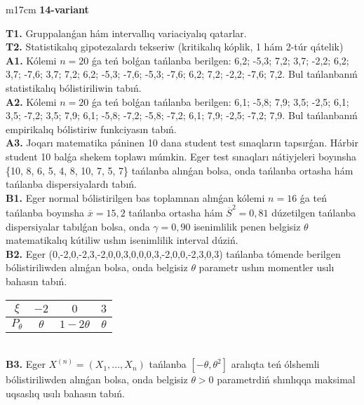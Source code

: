 \documentclass{article}
\begin{document}
\vspace{1cm}


\begin{tabular}{m{17cm}}
\textbf{14-variant}
\newline

\textbf{T1.} 
Gruppalanǵan hám intervallıq variaciyalıq qatarlar.
 \\
\textbf{T2.} 
Statistikalıq gipotezalardı tekseriw (kritikalıq kóplik, 1 hám 2-túr qátelik)
 \\
\textbf{A1.} 
Kólemi \(n = 20\) ǵa teń bolǵan tańlanba berilgen: 6,2; -5,3; 7,2; 3,7; -2,2; 6,2; 3,7; -7,6; 3,7; 7,2; 6,2; -5,3; -7,6; -5,3; -7,6; 6,2; 7,2; -2,2; -7,6; 7,2. Bul tańlanbanıń statistikalıq bólistiriliwin tabıń.
 \\
\textbf{A2.} 
Kólemi \(n = 20\) ǵa teń bolǵan tańlanba berilgen: 6,1; -5,8; 7,9; 3,5; -2,5; 6,1; 3,5; -7,2; 3,5; 7,9; 6,1; -5,8; -7,2; -5,8; -7,2; 6,1; 7,9; -2,5; -7,2; 7,9. Bul tańlanbanıń empirikalıq bólistiriw funkciyasın tabıń.
 \\
\textbf{A3.} 
Joqarı matematika páninen 10 dana student test sınaqların tapsırǵan. Hárbir student 10 balǵa shekem toplawı múmkin. Eger test sınaqları nátiyjeleri boyınsha \{10, 8, 6, 5, 4, 8, 10, 7, 5, 7\} tańlanba alınǵan bolsa, onda tańlanba ortasha hám tańlanba dispersiyalardı tabıń.
 \\
\textbf{B1.} 
Eger normal bólistirilgen bas toplamnan alınǵan kólemi \(n = 16\) ǵa teń tańlanba boyınsha \(\overline{x} = 15,2\) tańlanba ortasha hám \({\overline{S}}^{2} = 0,81\) dúzetilgen tańlanba dispersiyalar tabılǵan bolsa, onda \(\gamma = 0,90\) isenimlilik penen belgisiz \(\theta\) matematikalıq kútiliw ushın isenimlilik interval dúziń.
 \\
\textbf{B2.} 
Eger (0,-2,0,-2,3,-2,0,0,3,0,0,0,3,-2,0,0,-2,3,0,3) tańlanba tómende berilgen bólistiriliwden alınǵan bolsa, onda belgisiz \(\theta\) parametr ushın momentler usılı bahasın tabıń.
\begin{tabular}{|c|c|c|c|}
  \hline
$\xi$ & $- 2$  & $0$  & $3$ \\
\hline
\(P_{\theta}\) & \(\theta\) & \(1 - 2\theta\) & \(\theta\) \\
\hline
\end{tabular}
 \\
\textbf{B3.} 
Eger \(X^{(n)} = \left( X_{1},...,X_{n} \right)\) tańlanba \(\left\lbrack - \theta,\theta^{2} \right\rbrack\) aralıqta teń ólshemli bólistiriliwden alınǵan bolsa, onda belgisiz \(\theta > 0\) parametrdiń shınlıqqa maksimal uqsaslıq usılı bahasın tabıń.

\end{tabular}
\end{document}
